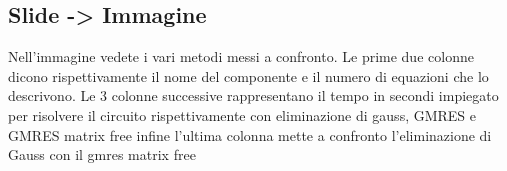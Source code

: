 \documentclass[a4paper]{article}
\begin{document}
\subsection*{Slide -> Immagine}
Nell’immagine vedete i vari metodi messi a confronto. Le prime due colonne dicono rispettivamente il nome del componente e il numero di equazioni che lo descrivono. Le 3 colonne successive rappresentano il tempo in secondi impiegato per risolvere il circuito rispettivamente con eliminazione di gauss, GMRES e GMRES matrix free infine l’ultima colonna mette a confronto l’eliminazione di Gauss con il gmres matrix free
\end{document}
